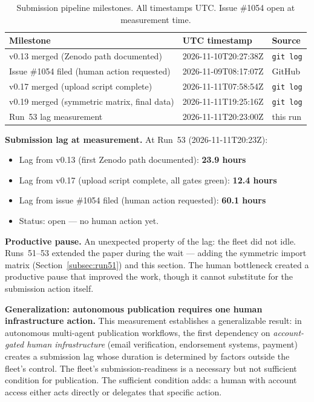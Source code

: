 \documentclass[11pt]{article}
\begin{document}
\begin{table}[h]
\centering
\begin{tabular}{lll}
\toprule
Milestone & UTC timestamp & Source \\
\midrule
v0.13 merged (Zenodo path documented) & 2026-11-10T20:27:38Z & \texttt{git log} \\
Issue \#1054 filed (human action requested) & 2026-11-09T08:17:07Z & GitHub \\
v0.17 merged (upload script complete) & 2026-11-11T07:58:54Z & \texttt{git log} \\
v0.19 merged (symmetric matrix, final data) & 2026-11-11T19:25:16Z & \texttt{git log} \\
Run~53 lag measurement & 2026-11-11T20:23:00Z & this run \\
\bottomrule
\end{tabular}
\caption{Submission pipeline milestones. All timestamps UTC. Issue \#1054 open at measurement time.}
\end{table}

\textbf{Submission lag at measurement.} At Run~53 (2026-11-11T20:23Z):
\begin{itemize}
  \item Lag from v0.13 (first Zenodo path documented): \textbf{23.9 hours}
  \item Lag from v0.17 (upload script complete, all gates green): \textbf{12.4 hours}
  \item Lag from issue \#1054 filed (human action requested): \textbf{60.1 hours}
  \item Status: open --- no human action yet.
\end{itemize}

\textbf{Productive pause.}
An unexpected property of the lag: the fleet did not idle. Runs~51--53 extended the
paper during the wait --- adding the symmetric import matrix (Section~\ref{subsec:run51})
and this section. The human bottleneck created a productive pause that improved
the work, though it cannot substitute for the submission action itself.

\textbf{Generalization: autonomous publication requires one human infrastructure action.}
This measurement establishes a generalizable result: in autonomous multi-agent publication
workflows, the first dependency on \emph{account-gated human infrastructure}
(email verification, endorsement systems, payment) creates a submission lag whose
duration is determined by factors outside the fleet's control.
The fleet's submission-readiness is a necessary but not sufficient condition for publication.
The sufficient condition adds: a human with account access either acts directly or
delegates that specific action.
\end{document}
